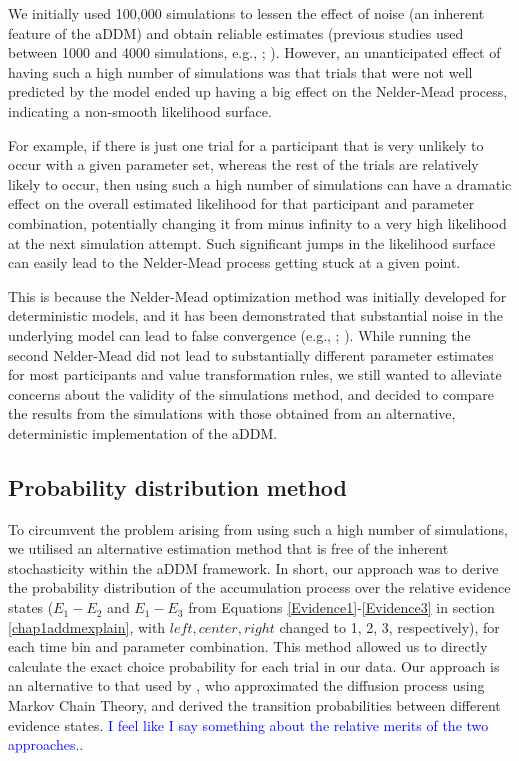 \documentclass[11pt,a4paper]{article}
\newcommand{\AT}[1] {{\textcolor{blue}{#1}}}
\begin{document}
We initially used 100,000 simulations to lessen the effect of noise (an inherent feature of the aDDM) and obtain reliable estimates (previous studies used between 1000 and 4000 simulations, e.g., ; ). However, an unanticipated effect of having such a high number of simulations was that trials that were not well predicted by the model ended up having a big effect on the Nelder-Mead process, indicating a non-smooth likelihood surface. 

For example, if there is just one trial for a participant that is very unlikely to occur with a given parameter set, whereas the rest of the trials are relatively likely to occur, then using such a high number of simulations can have a dramatic effect on the overall estimated likelihood for that participant and parameter combination, potentially changing it from minus infinity to a very high likelihood at the next simulation attempt. Such significant jumps in the likelihood surface can easily lead to the Nelder-Mead process getting stuck at a given point. 

This is because the Nelder-Mead optimization method was initially developed for deterministic models, and it has been demonstrated that substantial noise in the underlying model can lead to false convergence (e.g., ; ). While running the second Nelder-Mead did not lead to substantially different parameter estimates for most participants and value transformation rules, we still wanted to alleviate concerns about the validity of the simulations method, and decided to compare the results from the simulations with those obtained from an alternative, deterministic implementation of the aDDM.


\subsection{Probability distribution method}

To circumvent the problem arising from using such a high number of simulations, we utilised an alternative estimation method that is free of the inherent stochasticity within the aDDM framework. In short, our approach was to derive the probability distribution of the accumulation process over the relative evidence states ($E_{1}-E_{2}$ and $E_{1}-E_{3}$ from Equations \ref{Evidence1}-\ref{Evidence3} in section \ref{chap1addmexplain}, with $left, center, right$ changed to 1, 2, 3, respectively), for each time bin and parameter combination. This method allowed us to directly calculate the exact choice probability for each trial in our data. Our approach is an alternative to that used by , who approximated the diffusion process using Markov Chain Theory, and derived the transition probabilities between different evidence states. \AT{I feel like I say something about the relative merits of the two approaches..}
\end{document}
